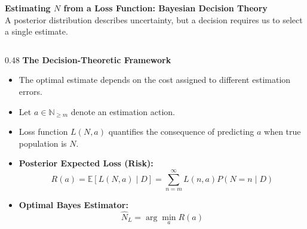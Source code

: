 \documentclass[aspectratio=169,10pt]{beamer}
\begin{document}
\begin{frame}[c]
  \begin{center}
    {\large \textbf{\color{headernavy} Estimating $N$ from a Loss Function: Bayesian Decision Theory}}\\[0.10cm]
    {\scriptsize \color{subgray} A posterior distribution describes uncertainty, but a decision requires us to select a single estimate.}
  \end{center}
  \vspace{0.38cm}
  
  \begin{columns}[t,onlytextwidth]
    \begin{column}{0.48\textwidth}
      {\small \textbf{\color{headernavy} The Decision-Theoretic Framework}}\\[0.08cm]
      {\scriptsize
      \begin{itemize}
        \setlength{\itemsep}{0.08cm}
        \item The optimal estimate depends on the cost assigned to different estimation errors.
        \item Let $a \in \mathbb{N}_{\ge m}$ denote an estimation action.
        \item Loss function $L(N, a)$ quantifies the consequence of predicting $a$ when true population is $N$.
        \item \textbf{Posterior Expected Loss (Risk):}
        \begin{equation*}
          R(a) = \mathbb{E}[L(N, a) \mid D] = \sum_{n=m}^\infty L(n, a) P(N = n \mid D)
        \end{equation*}
        \item \textbf{Optimal Bayes Estimator:}
        \begin{equation*}
          \widehat{N}_L = \arg\min_a R(a)
        \end{equation*}
      \end{itemize}}
    \end{column}
    

\end{columns}
\end{frame}
\end{document}
